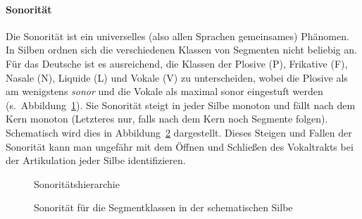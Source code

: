 \paragraph*{Sonorität}

Die Sonorität ist ein universelles (also allen Sprachen gemeinsames) Phänomen.
In Silben ordnen sich die verschiedenen Klassen von Segmenten nicht beliebig an.
Für das Deutsche ist es ausreichend, die Klassen der Plosive (P), Frikative (F), Nasale (N), Liquide (L) und Vokale (V) zu unterscheiden, wobei die Plosive als am wenigstens \textit{sonor} und die Vokale als maximal sonor eingestuft werden (s.~Abbildung~\ref{fig:sonoritaet085}).
Sie Sonorität steigt in jeder Silbe monoton und fällt nach dem Kern monoton (Letzteres nur, falls nach dem Kern noch Segmente folgen).
Schematisch wird dies in Abbildung~\ref{fig:sonoritaet086} dargestellt.
Dieses Steigen und Fallen der Sonorität kann man ungefähr mit dem Öffnen und Schließen des Vokaltrakts bei der Artikulation jeder Silbe identifizieren.

\begin{figure}[!htbp]
  \centering
  \caption{Sonoritätshierarchie}
  \label{fig:sonoritaet085}
\end{figure}

\begin{figure}[!htbp]
  \centering
  \caption{Sonorität für die Segmentklassen in der schematischen Silbe}
  \label{fig:sonoritaet086}
\end{figure}

